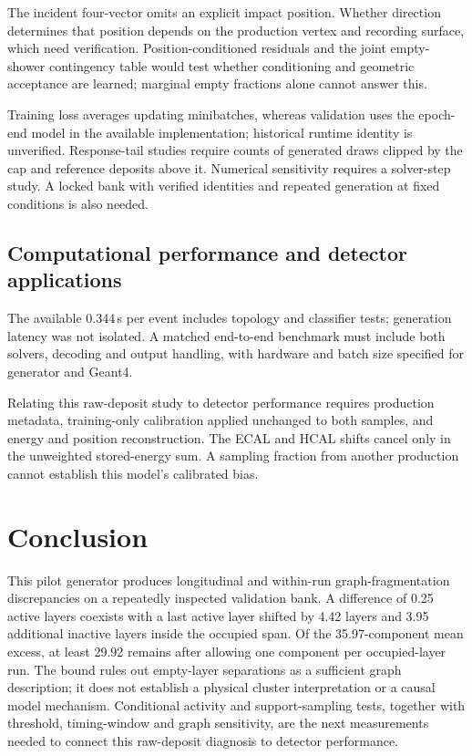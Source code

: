 \documentclass[11pt]{article}
\begin{document}
The incident four-vector omits an explicit impact position. Whether direction determines that position depends on the production vertex and recording surface, which need verification. Position-conditioned residuals and the joint empty-shower contingency table would test whether conditioning and geometric acceptance are learned; marginal empty fractions alone cannot answer this.

Training loss averages updating minibatches, whereas validation uses the epoch-end model in the available implementation; historical runtime identity is unverified. Response-tail studies require counts of generated draws clipped by the cap and reference deposits above it. Numerical sensitivity requires a solver-step study. A locked bank with verified identities and repeated generation at fixed conditions is also needed.

\subsection{Computational performance and detector applications}

The available 0.344\,s per event includes topology and classifier tests; generation latency was not isolated. A matched end-to-end benchmark must include both solvers, decoding and output handling, with hardware and batch size specified for generator and Geant4.

Relating this raw-deposit study to detector performance requires production metadata, training-only calibration applied unchanged to both samples, and energy and position reconstruction. The ECAL and HCAL shifts cancel only in the unweighted stored-energy sum. A sampling fraction from another production cannot establish this model's calibrated bias.

\section{Conclusion}

This pilot generator produces longitudinal and within-run graph-fragmentation discrepancies on a repeatedly inspected validation bank. A difference of 0.25 active layers coexists with a last active layer shifted by 4.42 layers and 3.95 additional inactive layers inside the occupied span. Of the 35.97-component mean excess, at least 29.92 remains after allowing one component per occupied-layer run. The bound rules out empty-layer separations as a sufficient graph description; it does not establish a physical cluster interpretation or a causal model mechanism. Conditional activity and support-sampling tests, together with threshold, timing-window and graph sensitivity, are the next measurements needed to connect this raw-deposit diagnosis to detector performance.
\end{document}
